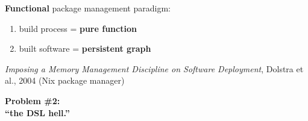 \documentclass{beamer}
\newcommand{\highlight}[1]{\alert{\textbf{#1}}}
\begin{document}
\begin{frame}[fragile]
  \vspace{2cm}
  \Large{
    \textbf{Functional} package management paradigm:

    \begin{enumerate}
    \item build process = \highlight{pure function}
    \item built software = \highlight{persistent graph}
    \end{enumerate}
  }

  \vfill{}
  \small{
    \textit{Imposing a Memory Management Discipline on
      Software Deployment}, Dolstra et al., 2004 (Nix package manager)
  }
\end{frame}

\begin{frame}
  \Huge{\textbf{Problem \#2:\\ ``the DSL hell.''}}
\end{frame}
\end{document}
